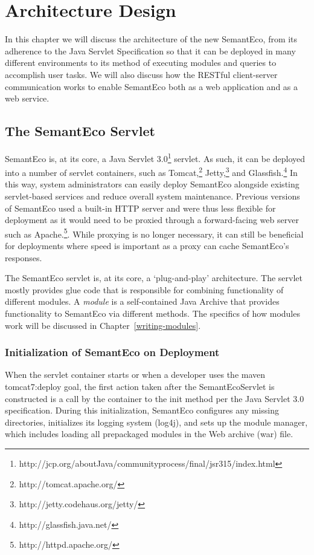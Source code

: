 \documentclass[letterpaper]{report}
\begin{document}
\chapter{Architecture Design}
\label{architecture}
In this chapter we will discuss the architecture of the new SemantEco, from its adherence to the Java Servlet Specification so that it can be deployed in many different environments to its method of executing modules and queries to accomplish user tasks. We will also discuss how the RESTful client-server communication works to enable SemantEco both as a web application and as a web service.

\section{The SemantEco Servlet}
\label{servlet}
SemantEco is, at its core, a Java Servlet 3.0\footnote{http://jcp.org/aboutJava/communityprocess/final/jsr315/index.html} servlet. As such, it can be deployed into a number of servlet containers, such as Tomcat,\footnote{http://tomcat.apache.org/} Jetty,\footnote{http://jetty.codehaus.org/jetty/} and Glassfish.\footnote{http://glassfish.java.net/} In this way, system administrators can easily deploy SemantEco alongside existing servlet-based services and reduce overall system maintenance. Previous versions of SemantEco used a built-in HTTP server and were thus less flexible for deployment as it would need to be proxied through a forward-facing web server such as Apache.\footnote{http://httpd.apache.org/}. While proxying is no longer necessary, it can still be beneficial for deployments where speed is important as a proxy can cache SemantEco's responses.

The SemantEco servlet is, at its core, a `plug-and-play' architecture. The servlet mostly provides glue code that is responsible for combining functionality of different modules. A \textit{module} is a self-contained Java Archive that provides functionality to SemantEco via different methods. The specifics of how modules work will be discussed in Chapter~\ref{writing-modules}.

\subsection{Initialization of SemantEco on Deployment} 
When the servlet container starts or when a developer uses the maven tomcat7:deploy goal, the first action taken after the SemantEcoServlet is constructed is a call by the container to the init method per the Java Servlet 3.0 specification. During this initialization, SemantEco configures any missing directories, initializes its logging system (log4j), and sets up the module manager, which includes loading all prepackaged modules in the Web archive (war) file.
\end{document}
